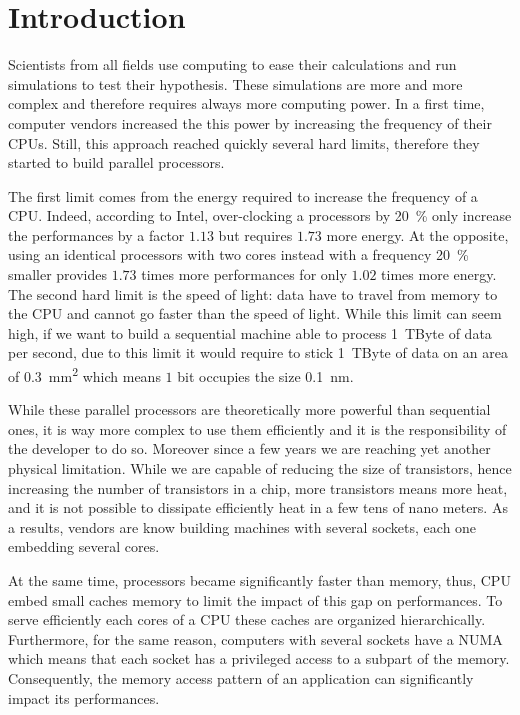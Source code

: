 \chapter{Introduction}

Scientists from all fields use computing to ease their calculations and run simulations to test their hypothesis.
These simulations are more and more complex and therefore requires always more computing power.
In a first time, computer vendors increased the this power by increasing the frequency of their \glspl{CPU}.
Still, this approach reached quickly several hard limits, therefore they started to build parallel processors.

The first limit comes from the energy required to increase the frequency of a \gls{CPU}.
Indeed, according to \gls{Intel}, over-clocking a processors by \SI{20}{\%} only increase the performances by a factor $1.13$ but requires $1.73$ more energy.
At the opposite, using an identical processors with two cores instead with a frequency \SI{20}{\%} smaller provides $1.73$ times more performances for only $1.02$ times more energy.
The second hard limit is the speed of light: data have to travel from memory to the \gls{CPU} and cannot go faster than the speed of light.
While this limit can seem high, if we want to build a sequential machine able to process \SI{1}{TByte} of data per second, due to this limit it would require  to stick \SI{1}{TByte} of data on an area of \SI{0.3}{mm^2} which means $1$ bit occupies the size \SI{0.1}{nm}.

While these parallel processors are theoretically more powerful than sequential ones, it is way more complex to use them efficiently and it is the responsibility of the developer to do so.
Moreover since a few years we are reaching yet another physical limitation.
While we are capable of reducing the size of transistors, hence increasing the number of transistors in a chip, more transistors means more heat, and it is not possible to dissipate efficiently heat in a few tens of nano meters.
As a results, vendors are know building machines with several sockets, each one embedding several cores.

At the same time, processors became significantly faster than memory, thus, \gls{CPU} embed small caches memory to limit the impact of this gap on performances.
To serve efficiently each cores of a \gls{CPU} these caches are organized hierarchically.
Furthermore, for the same reason, computers with several sockets have a \gls{NUMA} which means that each socket has a privileged access to a subpart of the memory.
Consequently, the memory access pattern of an application can significantly impact its performances.

